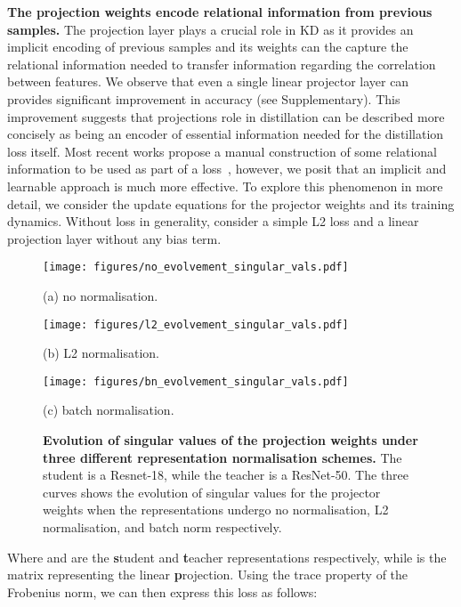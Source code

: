 \documentclass[letterpaper]{article} \usepackage[submission]{aaai23}  \usepackage{times}  \usepackage{helvet}  \usepackage{courier}  \usepackage[hyphens]{url}  \usepackage{graphicx} \urlstyle{rm} \def\UrlFont{\rm}  \usepackage{natbib}  \usepackage{caption} \frenchspacing  \setlength{\pdfpagewidth}{8.5in} \setlength{\pdfpageheight}{11in} \usepackage{algorithm}
\begin{document}
\noindent\textbf{The projection weights encode relational information from previous samples.} The projection layer plays a crucial role in KD as it provides an implicit encoding of previous samples and its weights can the capture the relational information needed to transfer information regarding the correlation between features. We observe that even a single linear projector layer can provides significant improvement in accuracy (see Supplementary). This improvement suggests that projections role in distillation can be described more concisely as being an encoder of essential information needed for the distillation loss itself. Most recent works propose a manual construction of some relational information to be used as part of a loss~\cite{Park2019RelationalDistillation, Tung2019Similarity-preservingDistillation}, however, we posit that an implicit and learnable approach is much more effective. To explore this phenomenon in more detail, we consider the update equations for the projector weights and its training dynamics. Without loss in generality, consider a simple L2 loss and a linear projection layer without any bias term.


\begin{figure*}
\centering
\begin{minipage}[b]{.32\textwidth}
\centering
\texttt{[image: figures/no\_evolvement\_singular\_vals.pdf]}
\caption*{(a) no normalisation.}
\end{minipage}
\hfill
\begin{minipage}[b]{.32\textwidth}
\centering
\texttt{[image: figures/l2\_evolvement\_singular\_vals.pdf]}
\caption*{(b) L2 normalisation.}
\end{minipage}
\hfill
\begin{minipage}[b]{.32\textwidth}
\centering
\texttt{[image: figures/bn\_evolvement\_singular\_vals.pdf]}
\caption*{(c) batch normalisation.}
\end{minipage}
\caption{\textbf{Evolution of singular values of the projection weights  under three different representation normalisation schemes.} The student is a Resnet-18, while the teacher is a ResNet-50. The three curves shows the evolution of singular values for the projector weights when the representations undergo no normalisation, L2 normalisation, and batch norm respectively.}
\label{fig:singular_values_evolution}
\end{figure*}


Where  and  are the \textbf{s}tudent and \textbf{t}eacher representations respectively, while  is the matrix representing the linear \textbf{p}rojection. Using the trace property of the Frobenius norm, we can then express this loss as follows:
\end{document}
